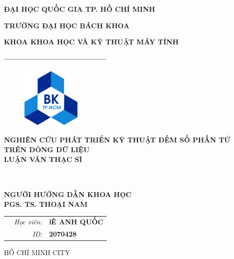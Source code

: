 \documentclass[a4paper,13pt]{article}
\theoremstyle{mytheor}
\begin{document}
\begin{titlepage}
\begin{center} {\textbf{ĐẠI HỌC QUỐC GIA TP. HỒ CHÍ MINH}
}

{\textbf{TRƯỜNG ĐẠI HỌC BÁCH KHOA}
}

{\textbf{KHOA KHOA HỌC VÀ KỸ THUẬT MÁY TÍNH }
}

{\textbf{---------------------------------------}}

\end{center}

\vspace{1cm}

\begin{figure}[h!]
\begin{center}
\includegraphics[width=3cm]{hcmut.png}
\end{center}
\end{figure}

\vspace{2cm}


\begin{center}
\textbf{\Large NGHIÊN CỨU PHÁT TRIỂN KỸ THUẬT ĐẾM SỐ PHẦN TỬ \\TRÊN DÒNG DỮ LIỆU}
\vspace{2cm}
\\
\textbf{\Large LUẬN VĂN THẠC SĨ}

\vspace{0.5cm}

\vspace{0.5cm}
\\
\vspace{1cm}
\\
\textbf{\small NGƯỜI HƯỚNG DẪN KHOA HỌC }
~~\\
\textbf{\small PGS. TS. THOẠI NAM}


\end{center}

\vspace{1cm}

\begin{table}[h]
\begin{tabular}{rrl}
\hspace{5.6cm} 
&\textit{Học viên: } & \textbf{lÊ ANH QUỐC}\\
&\textit{ID: } & \textbf{2070428}\\

\end{tabular}
\end{table}
\vspace{1cm}
\begin{center}
{\footnotesize HỒ CHÍ MINH CITY}
\end{center}
\end{titlepage}
\end{document}
